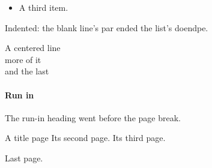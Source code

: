\documentclass{article}
\begin{document}
\begin{itemize}
\item A third item.
\end{itemize}

\pagebreak[1]
Indented: the blank line's par ended the list's doendpe.

{\centering A centered line\\ \nopagebreak more of it\\ \pagebreak[2] and the last\par}

\paragraph{Run in}
\newpage
The run-in heading went before the page break.
\begin{titlepage}
\centering A title page
\newpage
Its second page.
\clearpage
Its third page.
\end{titlepage}
\pagebreak
Last page.
\end{document}
